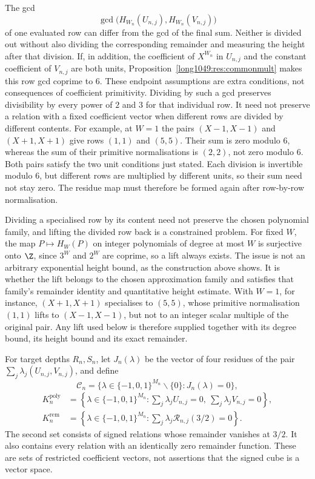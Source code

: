 The gcd
\[
 \gcd\!\bigl(H_{W_n}(U_{n,j}),H_{W_n}(V_{n,j})\bigr)
\]
of one evaluated row can differ from the gcd of the final sum. Neither
is divided out without also dividing the corresponding remainder and
measuring the height after that division. If, in addition, the
coefficient of $X^{W_n}$ in $U_{n,j}$ and the constant coefficient of
$V_{n,j}$ are both units, Proposition~\ref{long1049:res:commonmult}
makes this row gcd coprime to $6$. These endpoint assumptions are
extra conditions, not consequences of coefficient primitivity.
Dividing by such a gcd preserves divisibility by every power of $2$
and $3$ for that individual row. It need not preserve a relation
with a fixed coefficient vector when different rows are divided by different
contents. For example, at $W=1$ the pairs $(X-1,X-1)$ and $(X+1,X+1)$
give rows $(1,1)$ and $(5,5)$. Their sum is zero modulo $6$, whereas
the sum of their primitive normalisations is $(2,2)$, not zero modulo
$6$. Both pairs satisfy the two unit conditions just stated. Each division is invertible modulo $6$, but different rows are
multiplied by different units, so their sum need not stay zero.
The residue map must therefore be formed again after row-by-row
normalisation.

Dividing a specialised row by its content need not preserve the chosen
polynomial family, and lifting the divided row back is a constrained problem. For fixed $W$, the map $P\mapsto H_W(P)$ on integer polynomials of
degree at most $W$ is surjective onto $\Z$, since $3^{W}$ and $2^{W}$ are
coprime, so a lift always exists. The issue is not an arbitrary exponential
height bound, as the construction above shows. It is whether the lift
belongs to the chosen approximation family and satisfies that family's
remainder identity and quantitative height estimate. With $W=1$,
for instance, $(X+1,X+1)$ specialises to $(5,5)$, whose primitive
normalisation $(1,1)$ lifts to $(X-1,X-1)$, but not to an integer scalar
multiple of the original pair.  Any lift used below is therefore supplied together with its
degree bound, its height bound and its exact remainder.

For target depths $R_n,S_n$, let $J_n(\lambda)$ be the vector of four residues of
the pair $\sum_j\lambda_j(U_{n,j},V_{n,j})$, and define
\[
 \mathcal C_n=
 \{\lambda\in\{-1,0,1\}^{M_n}\mathbin{\backslash}\{0\}:J_n(\lambda)=0\},
\]
\[
\begin{aligned}
 K_n^{\mathrm{poly}}
   &=\left\{\lambda\in\{-1,0,1\}^{M_n}:
       \sum_j\lambda_jU_{n,j}=0,\ \sum_j\lambda_jV_{n,j}=0\right\},\\
 K_n^{\mathrm{rem}}
   &=\left\{\lambda\in\{-1,0,1\}^{M_n}:
       \sum_j\lambda_j\mathcal R_{n,j}(3/2)=0\right\}.
\end{aligned}
\]
The second set consists of signed relations whose remainder vanishes
at $3/2$. It also contains every relation with an identically zero
remainder function. These are sets of restricted coefficient vectors,
not assertions that the signed cube is a vector space.

